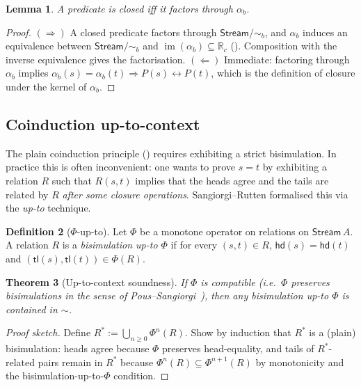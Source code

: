 \documentclass[12pt]{article}
\newtheorem{theorem}{Theorem}[section]
\newtheorem{lemma}[theorem]{Lemma}
\theoremstyle{definition}
\newtheorem{definition}[theorem]{Definition}
\theoremstyle{remark}
\newcommand{\R}{\mathbb{R}}
\newcommand{\Rc}{\R_c}
\newcommand{\Stream}{\mathsf{Stream}}
\newcommand{\hd}{\mathsf{hd}}
\newcommand{\tl}{\mathsf{tl}}
\newcommand{\bisim}{\mathrel{\sim}}
\DeclareMathOperator{\im}{im}
\begin{document}
\begin{lemma}\label{lem:observable-closed}
A predicate is closed iff it factors through $\alpha_b$.
\end{lemma}

\begin{proof}
$(\Rightarrow)$ A closed predicate factors through
$\Stream/{\bisim_b}$, and $\alpha_b$ induces an equivalence
between $\Stream/{\bisim_b}$ and $\im(\alpha_b)\subseteq\Rc$
(). Composition with the inverse equivalence
gives the factorisation.
$(\Leftarrow)$ Immediate: factoring through $\alpha_b$ implies
$\alpha_b(s)=\alpha_b(t)\Rightarrow P(s)\leftrightarrow P(t)$, which
is the definition of closure under the kernel of $\alpha_b$.
\end{proof}

\subsection{Coinduction up-to-context}

The plain coinduction principle () requires
exhibiting a strict bisimulation. In practice this is often
inconvenient: one wants to prove $s = t$ by exhibiting a relation
$R$ such that $R(s,t)$ implies that the heads agree and the
tails are related by $R$ \emph{after some closure operations}.
Sangiorgi--Rutten formalised this via the \emph{up-to} technique.

\begin{definition}[$\Phi$-up-to]\label{def:upto}
Let $\Phi$ be a monotone operator on relations on $\Stream\,A$.
A relation $R$ is a \emph{bisimulation up-to $\Phi$} if for every
$(s,t) \in R$, $\hd(s) = \hd(t)$ and
$(\tl(s), \tl(t)) \in \Phi(R)$.
\end{definition}

\begin{theorem}[Up-to-context soundness]\label{thm:upto-sound}
If $\Phi$ is \emph{compatible} (i.e.\ $\Phi$ preserves bisimulations
in the sense of Pous--Sangiorgi~\cite{poussangiorgi}), then any
bisimulation up-to $\Phi$ is contained in $\bisim$.
\end{theorem}

\begin{proof}[Proof sketch]
Define $R^* := \bigcup_{n\geq 0}\Phi^n(R)$. Show by induction
that $R^*$ is a (plain) bisimulation: heads agree because
$\Phi$ preserves head-equality, and tails of $R^*$-related pairs
remain in $R^*$ because $\Phi^n(R) \subseteq \Phi^{n+1}(R)$ by
monotonicity and the bisimulation-up-to-$\Phi$ condition.
\end{proof}
\end{document}

